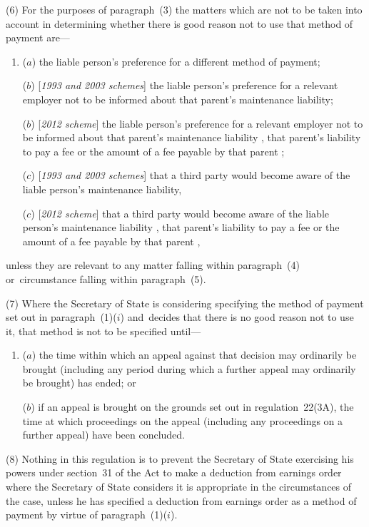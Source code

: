\documentclass[12pt,a4paper]{article}
\begin{document}
(6) For the purposes of paragraph~(3) the matters which are not to be taken into account in determining whether there is good reason not to use that method of payment are—
\begin{enumerate}\item[]
($a$) the liable person’s preference for a different method of payment;

($b$) [\emph{1993 and 2003 schemes}] the liable person’s preference for a relevant employer not to be informed about that parent’s maintenance liability;

($b$) [\emph{2012 scheme}] the liable person’s preference for a relevant employer not to be informed about that parent’s maintenance liability%
, that parent’s liability to pay a fee or the amount of a fee payable by that parent%
;

($c$) [\emph{1993 and 2003 schemes}] that a third party would become aware of the liable person’s maintenance liability,

($c$) [\emph{2012 scheme}] that a third party would become aware of the liable person’s maintenance liability%
, that parent’s liability to pay a fee or the amount of a fee payable by that parent%
,
\end{enumerate}
unless they are relevant to any matter falling within paragraph~(4) or~circumstance falling within paragraph~(5).

(7) Where the Secretary of State is considering specifying the method of payment set out in paragraph~(1)($i$)  and~decides that there is no good reason not to use it, that method is not to be specified until—
\begin{enumerate}\item[]
($a$) the time within which an appeal against that decision may ordinarily be brought (including any period during which a further appeal may ordinarily be brought) has ended; or

($b$) if an appeal is brought on the grounds set out in regulation~22(3A), the time at which proceedings on the appeal (including any proceedings on a further appeal) have been concluded.
\end{enumerate}

(8) Nothing in this regulation is to prevent the Secretary of State exercising his powers under section~31 of the Act to make a deduction from earnings order where the Secretary of State considers it is appropriate in the circumstances of the case, unless he has specified a deduction from earnings order as a method of payment by virtue of paragraph~(1)($i$).
\end{document}
